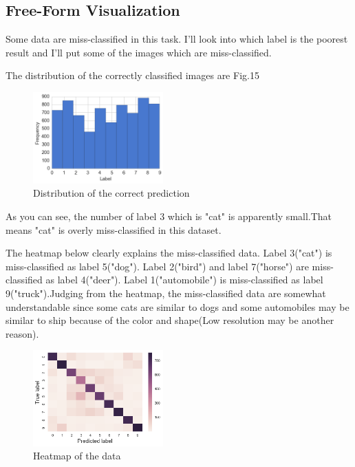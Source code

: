 \subsection{Free-Form Visualization}
Some data are miss-classified in this task. I'll look into which label is the poorest result and I'll put some of the images which are miss-classified.

The distribution of the correctly classified images are Fig.15

\begin{figure}[H]

	\begin{center}
	\includegraphics[width=5cm]{picture/label_correct.png}
	\caption{Distribution of the correct prediction}
	\end{center}
	\label{fig:15}

\end{figure}

As you can see, the number of label 3 which is "cat" is apparently small.That means "cat" is overly miss-classified in this dataset.







The heatmap below clearly explains the miss-classified data. Label 3("cat") is miss-classified as label 5("dog"). Label 2("bird") and label 7("horse") are miss-classified as label 4("deer"). Label 1("automobile") is miss-classified as label 9("truck").Judging from the heatmap, the miss-classified data are somewhat understandable since some cats are similar to dogs and some automobiles may be similar to ship because of the color and shape(Low resolution may be another reason).




\begin{figure}[H]

	\begin{center}
	\includegraphics[width=5cm]{picture/heatmap.png}
	\caption{Heatmap of the data}
	\end{center}
	\label{fig:17}

\end{figure}

